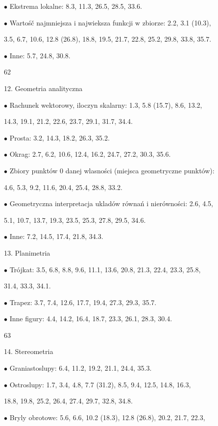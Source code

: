 \documentclass[a4paper,12pt]{article}
\begin{document}
$\bullet$ Ekstrema lokalne: 8.3, 11.3, 26.5, 28.5, 33.6.

$\bullet$ Wartośč najmniejsza $\mathrm{i}$ najwieksza funkcji $\mathrm{w}$ zbiorze: 2.2, 3.1 (10.3),

3.5, 6.7, 10.6, 12.8 (26.8), 18.8, 19.5, 21.7, 22.8, 25.2, 29.8, 33.8, 35.7.

$\bullet$ Inne: 5.7, 24.8, 30.8.





62

12. Geometria analityczna

$\bullet$ Rachunek wektorowy, iloczyn skalarny: 1.3, 5.8 (15.7), 8.6, 13.2,

14.3, 19.1, 21.2, 22.6, 23.7, 29.1, 31.7, 34.4.

$\bullet$ Prosta: 3.2, 14.3, 18.2, 26.3, 35.2.

$\bullet$ Okrag: 2.7, 6.2, 10.6, 12.4, 16.2, 24.7, 27.2, 30.3, 35.6.

$\bullet$ Zbiory punktów $0$ danej wlasności (miejsca geometryczne punktów):

4.6, 5.3, 9.2, 11.6, 20.4, 25.4, 28.8, 33.2.

$\bullet$ Geometryczna interpretacja ukladów równań $\mathrm{i}$ nierówności: 2.6, 4.5,

5.1, 10.7, 13.7, 19.3, 23.5, 25.3, 27.8, 29.5, 34.6.

$\bullet$ Inne: 7.2, 14.5, 17.4, 21.8, 34.3.

13. Planimetria

$\bullet$ Trójkat: 3.5, 6.8, 8.8, 9.6, 11.1, 13.6, 20.8, 21.3, 22.4, 23.3, 25.8,

31.4, 33.3, 34.1.

$\bullet$ Trapez: 3.7, 7.4, 12.6, 17.7, 19.4, 27.3, 29.3, 35.7.

$\bullet$ Inne figury: 4.4, 14.2, 16.4, 18.7, 23.3, 26.1, 28.3, 30.4.





63

14. Stereometria

$\bullet$ Graniastoslupy: 6.4, 11.2, 19.2, 21.1, 24.4, 35.3.

$\bullet$ Ostroslupy: 1.7, 3.4, 4.8, 7.7 (31.2), 8.5, 9.4, 12.5, 14.8, 16.3,

18.8, 19.8, 25.2, 26.4, 27.4, 29.7, 32.8, 34.8.

$\bullet$ Bryly obrotowe: 5.6, 6.6, 10.2 (18.3), 12.8 (26.8), 20.2, 21.7, 22.3,
\end{document}
